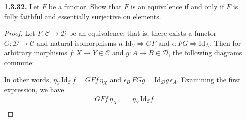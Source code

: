 \documentclass[ 12pt ]{article}
\begin{document}
\begin{enumerate}
\begin{enumerate}
\begin{proof}
\begin{enumerate}
					\item[\textbf{c.}] For an $n$-element set $X$, it is clear that $|\mathrm{Sym} X| = n!$, the set of all permutations on $X$. As for $\mathrm{Ord} X$, each total order of $X$ is an enumeration of $X$, again a permutation. Hence, $|\mathrm{Sym} X| = |\mathrm{Ord} X| = n!$. Moreover, $\mathrm{Sym} X \cong \mathrm{Ord} X$ for all $X \in \mathscr{B}$ in $\mathsf{Set}$, but not naturally in $X \in \mathscr{B}$.
				\end{enumerate}
			\end{proof}

			\item[\textbf{1.3.32.}] Let $F$ be a functor. Show that $F$ is an equivalence if and only if $F$ is fully faithful and essentially surjective on elements.

			\begin{proof}
				Let $F : \mathscr{C} \to \mathscr{D}$ be an equivalence; that is, there exists a functor $G : \mathscr{D} \to \mathscr{C}$ and natural isomorphisms $\eta : \mathrm{Id}_\mathscr{C} \Rightarrow GF$ and $\epsilon : FG \Rightarrow \mathrm{Id}_\mathscr{D}$. Then for arbitrary morphisms $f : X \to Y \in \mathscr{C}$ and $g : A \to B \in \mathscr{D}$, the following diagrams commute:
				\begin{center}
				\end{center}
				In other words, $\eta_Y\, \mathrm{Id}_\mathscr{C}\, f = GF f\, \eta_X$ and $\epsilon_B\, FG g = \mathrm{Id}_\mathscr{D} g\, \epsilon_A$. Examining the first expression, we have
				\begin{align*}
					GF f\, \eta_X &= \eta_Y\, \mathrm{Id}_\mathscr{C} f \\

\end{align*}
\end{proof}
\end{enumerate}
\end{enumerate}
\end{document}
